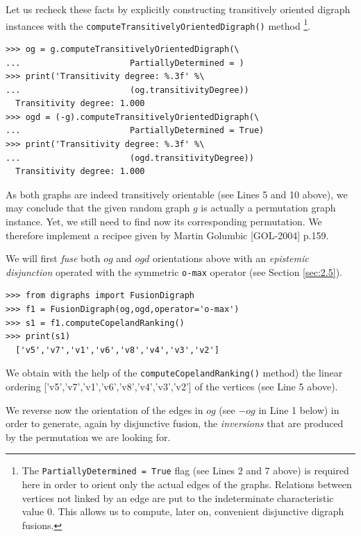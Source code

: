 Let us recheck these facts by explicitly constructing transitively oriented digraph instances with the \texttt{computeTransitivelyOrientedDigraph()} method \footnote{The \texttt{PartiallyDetermined = True} flag (see Lines 2 and 7 above) is required here in order to orient only the actual edges of the graphs. Relations between vertices not linked by an edge are put to the indeterminate characteristic value $0$. This allows us to compute, later on, convenient disjunctive digraph fusions.
}. 
\begin{lstlisting}
>>> og = g.computeTransitivelyOrientedDigraph(\
...                      PartiallyDetermined = )
>>> print('Transitivity degree: %.3f' %\
...                      (og.transitivityDegree)) 
  Transitivity degree: 1.000
>>> ogd = (-g).computeTransitivelyOrientedDigraph(\
...                      PartiallyDetermined = True)
>>> print('Transitivity degree: %.3f' %\
...                      (ogd.transitivityDegree)) 
  Transitivity degree: 1.000
\end{lstlisting}

As both graphs are indeed transitively orientable (see Lines 5 and 10 above), we may conclude that the given random graph $g$ is actually a permutation graph instance. Yet, we still need to find now its corresponding permutation. We therefore implement a recipee given by Martin Golumbic [GOL-2004] p.159.

We will first \emph{fuse} both $og$ and $ogd$ orientations above with an \emph{epistemic disjunction} operated with the symmetric \texttt{o-max} operator (see Section \ref{sec:2.5}).
\begin{lstlisting}
>>> from digraphs import FusionDigraph
>>> f1 = FusionDigraph(og,ogd,operator='o-max')
>>> s1 = f1.computeCopelandRanking()
>>> print(s1)
  ['v5','v7','v1','v6','v8','v4','v3','v2']
\end{lstlisting}
We obtain with the help of the \texttt{computeCopelandRanking()} method) the linear ordering ['v5','v7','v1','v6','v8','v4','v3','v2'] of the vertices (see Line 5 above).

We reverse now the orientation of the edges in $og$ (see $-og$ in Line 1 below) in order to generate, again by disjunctive fusion, the \emph{inversions} that are produced by the permutation we are looking for.


